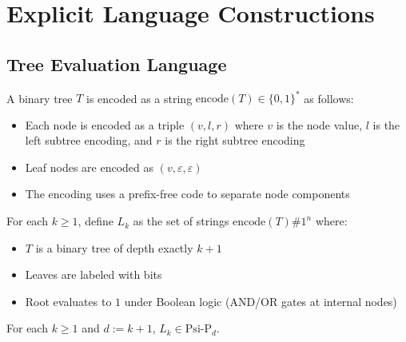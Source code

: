 \section{Explicit Language Constructions}

\subsection{Tree Evaluation Language}

\begin{definition}
A binary tree $T$ is encoded as a string $\text{encode}(T) \in \{0,1\}^*$ as follows:
\begin{itemize}
\item Each node is encoded as a triple $(v, l, r)$ where $v$ is the node value, $l$ is the left subtree encoding, and $r$ is the right subtree encoding
\item Leaf nodes are encoded as $(v, \varepsilon, \varepsilon)$
\item The encoding uses a prefix-free code to separate node components
\end{itemize}
\end{definition}

\begin{definition}
For each $k \geq 1$, define $L_k$ as the set of strings $\text{encode}(T)\#1^n$ where:
\begin{itemize}
\item $T$ is a binary tree of depth exactly $k+1$
\item Leaves are labeled with bits  
\item Root evaluates to $1$ under Boolean logic (AND/OR gates at internal nodes)
\end{itemize}
\end{definition}

\begin{claim}
For each $k \geq 1$ and $d := k{+}1$, $L_k \in \text{Psi-P}_{d}$.
\end{claim}

